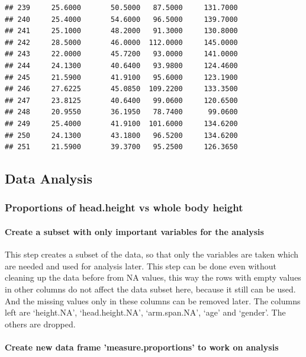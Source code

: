 \documentclass[]{article}
\begin{document}
\begin{verbatim}
## 239     25.6000       50.5000   87.5000     131.7000
## 240     25.4000       54.6000   96.5000     139.7000
## 241     25.1000       48.2000   91.3000     130.8000
## 242     28.5000       46.0000  112.0000     145.0000
## 243     22.0000       45.7200   93.0000     141.0000
## 244     24.1300       40.6400   93.9800     124.4600
## 245     21.5900       41.9100   95.6000     123.1900
## 246     27.6225       45.0850  109.2200     133.3500
## 247     23.8125       40.6400   99.0600     120.6500
## 248     20.9550       36.1950   78.7400      99.0600
## 249     25.4000       41.9100  101.6000     134.6200
## 250     24.1300       43.1800   96.5200     134.6200
## 251     21.5900       39.3700   95.2500     126.3650
\end{verbatim}

\newpage

\subsection{Data Analysis}
\label{sec:appendix-data-analysis}

\subsubsection{Proportions of head.height vs whole body height}
\label{sec:appendix-height-vs-head.height}

\paragraph{Create a subset with only important variables for the analysis}
\label{sec:appendix-create-subset}

This step creates a subset of the data, so that only the variables are
taken which are needed and used for analysis later. This step can be
done even without cleaning up the data before from NA values, this way
the rows with empty values in other columns do not affect the data
subset here, because it still can be used. And the missing values only
in these columns can be removed later. The columns left are `height.NA',
`head.height.NA', `arm.span.NA', `age' and `gender'. The others are
dropped.

\paragraph{Create new data frame 'measure.proportions' to work on analysis}
\label{sec:appendix-create-data-frame-no-NA}
\end{document}
